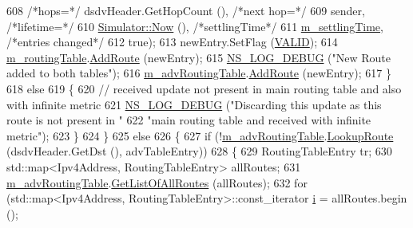 \begin{DoxyCode}
608                 \textcolor{comment}{/*hops=*/} dsdvHeader.GetHopCount (), \textcolor{comment}{/*next hop=*/}
609                 sender, \textcolor{comment}{/*lifetime=*/}
610                 \hyperlink{classns3_1_1Simulator_ac3178fa975b419f7875e7105be122800}{Simulator::Now} (), \textcolor{comment}{/*settlingTime*/}
611                 \hyperlink{classns3_1_1dsdv_1_1RoutingProtocol_ac00a3214f64eddbab1fbf039aa293ae9}{m\_settlingTime}, \textcolor{comment}{/*entries changed*/}
612                 \textcolor{keyword}{true});
613               newEntry.SetFlag (\hyperlink{namespacens3_1_1dsdv_aa1c39555b993cc6f56f2c8c6c31e2c3baf2cbf3d202d1c7338230c662e6822e65}{VALID});
614               \hyperlink{classns3_1_1dsdv_1_1RoutingProtocol_acc4cee466c2591e35f508ce58097a00e}{m\_routingTable}.\hyperlink{classns3_1_1dsdv_1_1RoutingTable_a4eed9bac83e90f1db01e414892e10b9b}{AddRoute} (newEntry);
615               \hyperlink{group__logging_ga413f1886406d49f59a6a0a89b77b4d0a}{NS\_LOG\_DEBUG} (\textcolor{stringliteral}{"New Route added to both tables"});
616               \hyperlink{classns3_1_1dsdv_1_1RoutingProtocol_adce3cf63777d6099e58caa1cb198282c}{m\_advRoutingTable}.\hyperlink{classns3_1_1dsdv_1_1RoutingTable_a4eed9bac83e90f1db01e414892e10b9b}{AddRoute} (newEntry);
617             \}
618           \textcolor{keywordflow}{else}
619             \{
620               \textcolor{comment}{// received update not present in main routing table and also with infinite metric}
621               \hyperlink{group__logging_ga413f1886406d49f59a6a0a89b77b4d0a}{NS\_LOG\_DEBUG} (\textcolor{stringliteral}{"Discarding this update as this route is not present in "}
622                             \textcolor{stringliteral}{"main routing table and received with infinite metric"});
623             \}
624         \}
625       \textcolor{keywordflow}{else}
626         \{
627           \textcolor{keywordflow}{if} (!\hyperlink{classns3_1_1dsdv_1_1RoutingProtocol_adce3cf63777d6099e58caa1cb198282c}{m\_advRoutingTable}.\hyperlink{classns3_1_1dsdv_1_1RoutingTable_a0bfb9dc677f02bd740973865e38df763}{LookupRoute} (dsdvHeader.GetDst (),
      advTableEntry))
628             \{
629               RoutingTableEntry tr;
630               std::map<Ipv4Address, RoutingTableEntry> allRoutes;
631               \hyperlink{classns3_1_1dsdv_1_1RoutingProtocol_adce3cf63777d6099e58caa1cb198282c}{m\_advRoutingTable}.\hyperlink{classns3_1_1dsdv_1_1RoutingTable_af980697df819d8a00ee8782c705e3dac}{GetListOfAllRoutes} (allRoutes);
632               \textcolor{keywordflow}{for} (std::map<Ipv4Address, RoutingTableEntry>::const\_iterator \hyperlink{bernuolliDistribution_8m_a6f6ccfcf58b31cb6412107d9d5281426}{i} = allRoutes.begin (); 

\end{DoxyCode}
